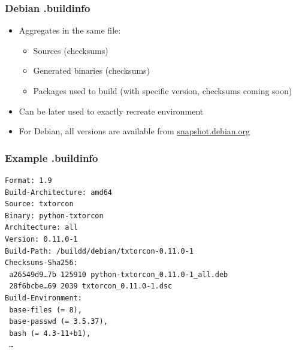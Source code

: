 \documentclass[14pt]{beamer}
\begin{document}
\begin{frame}
 \frametitle{Debian .buildinfo}

 \begin{itemize}
  \item Aggregates in the same file:
   \begin{itemize}
    \item Sources (checksums)
    \item Generated binaries (checksums)
    \item Packages used to build (with specific version, checksums coming soon)
   \end{itemize}
  \item Can be later used to exactly recreate environment
  \item For Debian, all versions are available from \url{snapshot.debian.org}
 \end{itemize}
\end{frame}


\begin{frame}[fragile]
 \frametitle{Example .buildinfo}

{\small
\begin{verbatim}
Format: 1.9
Build-Architecture: amd64
Source: txtorcon
Binary: python-txtorcon
Architecture: all
Version: 0.11.0-1
Build-Path: /buildd/debian/txtorcon-0.11.0-1
Checksums-Sha256:
 a26549d9…7b 125910 python-txtorcon_0.11.0-1_all.deb
 28f6bcbe…69 2039 txtorcon_0.11.0-1.dsc
Build-Environment:
 base-files (= 8),
 base-passwd (= 3.5.37),
 bash (= 4.3-11+b1),
 …
\end{verbatim}
}
\end{frame}
\end{document}
